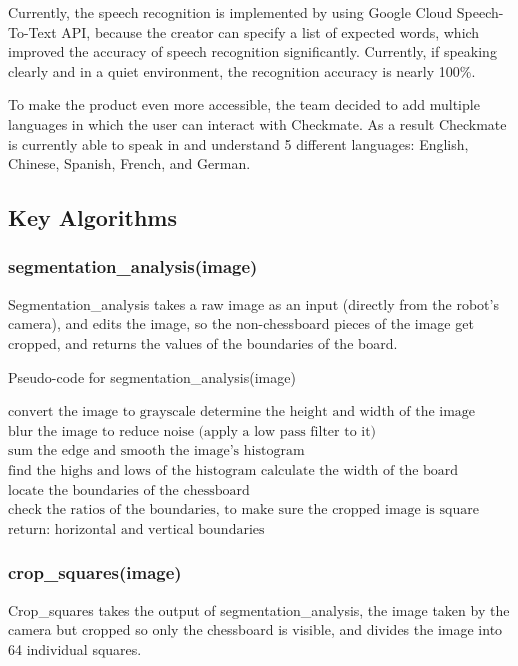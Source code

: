 \documentclass[onecolumn]{IEEEtran}
\begin{document}
Currently, the speech recognition is implemented by using Google Cloud Speech-To-Text API, because the creator can specify a list of expected words, which improved the accuracy of speech recognition significantly. Currently, if speaking clearly and in a quiet environment, the recognition accuracy is nearly 100\%.\par
To make the product even more accessible, the team decided to add multiple languages in which the user can interact with Checkmate. As a result Checkmate is currently able to speak in and understand 5 different languages: English, Chinese, Spanish, French, and German.


\subsection{Key Algorithms}
\subsubsection{segmentation\_analysis(image)}
Segmentation\_analysis takes a raw image as an input (directly from the robot's camera), and edits the image, so the non-chessboard pieces of the image get cropped, and returns the values of the boundaries of the board.

\begin{algorithm}[H]
\caption{Pseudo-code for segmentation\_analysis(image)}
\begin{algorithmic}[1]
\STATE {}
\STATE$\text{convert the image to grayscale}$
\STATE$\text{determine the height and width of the image}$ 
\STATE$\text{blur the image to reduce noise (apply a low pass filter to it)}$
\STATE {}
\STATEx {} 
\STATE$\text{sum the edge and smooth the image's histogram}$ 
\STATE$\text{find the highs and lows of the histogram}$
\STATE$\text{calculate the width of the board}$
\STATE$\text{locate the boundaries of the chessboard}$
\STATE$\text{check the ratios of the boundaries, to make sure the cropped image is square}$
\STATE $\text{return: horizontal and vertical boundaries}$
\end{algorithmic}
\end{algorithm}

 
\subsubsection{crop\_squares(image)} 
Crop\_squares takes the output of segmentation\_analysis, the image taken by the camera but cropped so only the chessboard is visible, and divides the image into 64 individual squares. 
\end{document}
